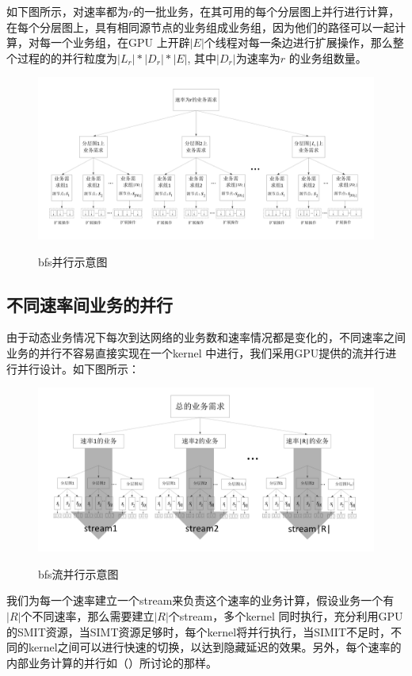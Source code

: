 如下图所示，对速率都为$r$的一批业务，在其可用的每个分层图上并行进行计算，在每个分层图上，具有相同源节点的业务组成业务组，因为他们的路径可以一起计算，对每一个业务组，在GPU 上开辟$|E|$个线程对每一条边进行扩展操作，那么整个过程的的并行粒度为$|L_r|*|D_r|*|E|$, 其中$|D_r|$为速率为$r$ 的业务组数量。
 \begin{figure}
\setlength{\belowcaptionskip}{-0.5cm}
  \begin{center}
    {\includegraphics[width=1 \textwidth]{figures/bfs.pdf}}
    \end{center}
  \caption{{\footnotesize{bfs并行示意图}}}
  \label{bfs}
\end{figure}
\subsection{不同速率间业务的并行}
  由于动态业务情况下每次到达网络的业务数和速率情况都是变化的，不同速率之间业务的并行不容易直接实现在一个kernel 中进行，我们采用GPU提供的流并行进行并行设计。如下图所示：
 \begin{figure}
\setlength{\belowcaptionskip}{-0.5cm}
  \begin{center}
    {\includegraphics[width=1 \textwidth]{figures/hbfs.pdf}}
    \end{center}
  \caption{{\footnotesize{bfs流并行示意图}}}
  \label{bfssteam}
\end{figure}
 我们为每一个速率建立一个stream来负责这个速率的业务计算，假设业务一个有$|R|$个不同速率，那么需要建立$|R|$个stream，多个kernel 同时执行，充分利用GPU 的SMIT资源，当SIMT资源足够时，每个kernel将并行执行，当SIMIT不足时，不同的kernel之间可以进行快速的切换，以达到隐藏延迟的效果。另外，每个速率的内部业务计算的并行如（）所讨论的那样。

